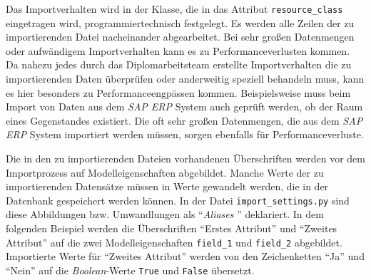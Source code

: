 Das Importverhalten wird in der Klasse, die in das Attribut
\texttt{resource\_class} eingetragen wird, programmiertechnisch
festgelegt. Es werden alle Zeilen der zu importierenden Datei
nacheinander abgearbeitet. Bei sehr großen Datenmengen oder aufwändigem
Importverhalten kann es zu Performanceverlusten kommen. Da nahezu jedes
durch das Diplomarbeitsteam erstellte Importverhalten die zu
importierenden Daten überprüfen oder anderweitig speziell behandeln
muss, kann es hier besonders zu Performanceengpässen kommen.
Beispielsweise muss beim Import von Daten aus dem \emph{SAP ERP}
System auch geprüft werden, ob der Raum eines Gegenstandes existiert.
Die oft sehr großen Datenmengen, die aus dem \emph{SAP ERP}
System importiert werden müssen, sorgen ebenfalls für
Performanceverluste.

Die in den zu importierenden Dateien vorhandenen Überschriften werden
vor dem Importprozess auf Modelleigenschaften abgebildet. Manche Werte
der zu importierenden Datensätze müssen in Werte gewandelt werden, die
in der Datenbank gespeichert werden können. In der Datei
\texttt{import\_settings.py} sind diese Abbildungen bzw. Umwandlungen
als ``\emph{Aliases} '' deklariert. In dem
folgenden Beispiel werden die Überschriften ``Erstes Attribut'' und
``Zweites Attribut'' auf die zwei Modelleigenschaften \texttt{field\_1}
und \texttt{field\_2} abgebildet. Importierte Werte für ``Zweites
Attribut'' werden von den Zeichenketten ``Ja'' und ``Nein'' auf die
\emph{Boolean}-Werte
\texttt{True} und \texttt{False} übersetzt.

\begin{Shaded}
\begin{Highlighting}[]
\OperatorTok{=}\NormalTok{ \{}
    \NormalTok{: ([}\NormalTok{], \{}

\NormalTok{    \}),}
    \NormalTok{: ([}\NormalTok{], \{}
      \NormalTok{: }\NormalTok{,}
      \NormalTok{: }
\NormalTok{    \}),}
\end{Highlighting}
\end{Shaded}

